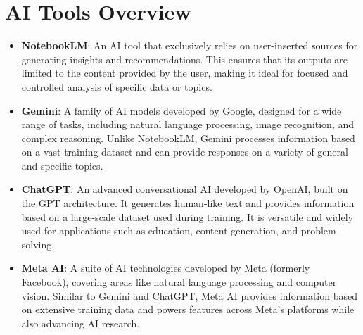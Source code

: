 \section*{AI Tools Overview}

\begin{itemize}
    \item \textbf{NotebookLM}: An AI tool that exclusively relies on user-inserted sources for generating insights and recommendations. This ensures that its outputs are limited to the content provided by the user, making it ideal for focused and controlled analysis of specific data or topics.

    \item \textbf{Gemini}: A family of AI models developed by Google, designed for a wide range of tasks, including natural language processing, image recognition, and complex reasoning. Unlike NotebookLM, Gemini processes information based on a vast training dataset and can provide responses on a variety of general and specific topics.

    \item \textbf{ChatGPT}: An advanced conversational AI developed by OpenAI, built on the GPT architecture. It generates human-like text and provides information based on a large-scale dataset used during training. It is versatile and widely used for applications such as education, content generation, and problem-solving.

    \item \textbf{Meta AI}: A suite of AI technologies developed by Meta (formerly Facebook), covering areas like natural language processing and computer vision. Similar to Gemini and ChatGPT, Meta AI provides information based on extensive training data and powers features across Meta's platforms while also advancing AI research.
\end{itemize}
\pagebreak